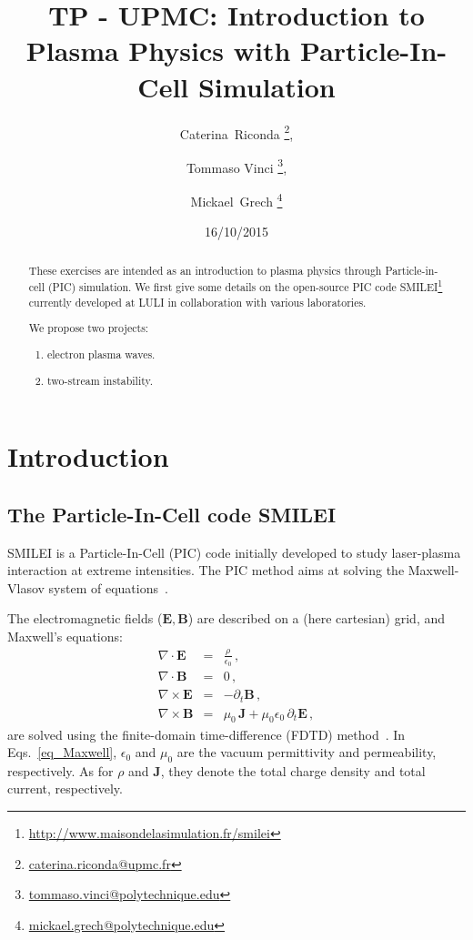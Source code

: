 \documentclass[11pt,a4paper]{article}
\newcommand{\vE}{\mathbf{E}}
\newcommand{\vB}{\mathbf{B}}
\newcommand{\vJ}{\mathbf{J}}
\begin{document}
\title{TP - UPMC: Introduction to Plasma Physics with Particle-In-Cell Simulation}


\author{Caterina~Riconda \footnote{\url{caterina.riconda@upmc.fr}}, \and Tommaso Vinci \footnote{\url{tommaso.vinci@polytechnique.edu}}, \and Mickael~Grech \footnote{\url{mickael.grech@polytechnique.edu}}}

\date{16/10/2015}

\maketitle              


\begin{abstract}
These exercises are intended as an introduction to plasma physics through Particle-in-cell (PIC) simulation.
We first give some details on the open-source PIC code SMILEI\footnote{\url{http://www.maisondelasimulation.fr/smilei}} currently developed at LULI in collaboration with various laboratories.

We propose two projects: 
\begin{enumerate}
\item electron plasma waves.
\item two-stream instability.
\end{enumerate}
\end{abstract}




\section*{Introduction}\label{intro}

\subsection*{The Particle-In-Cell code SMILEI}

SMILEI is a Particle-In-Cell (PIC) code initially developed to study laser-plasma interaction at extreme intensities. 
The PIC method aims at solving the Maxwell-Vlasov system of  equations~\cite{birdsall_langdon}.

The electromagnetic fields ($\vE,\vB$) are described on a (here cartesian) grid, and Maxwell's equations:
\begin{subequations}\label{eq_Maxwell}
\begin{eqnarray}
\nabla \cdot \vE &=& \frac{\rho}{\epsilon_0} \,,\\
\nabla \cdot \vB &=& 0 \,,\\
\nabla \times \vE &=& -\partial_t \vB \,,\\
\nabla \times \vB &=& \mu_0\, \vJ + \mu_0 \epsilon_0\,\partial_t \vE \,,
\end{eqnarray}
\end{subequations}
are solved using the finite-domain time-difference (FDTD) method~\cite{taflove_2005}.
In Eqs.~\eqref{eq_Maxwell}, $\epsilon_0$ and $\mu_0$ are the vacuum permittivity and permeability, respectively. 
As for $\rho$ and $\vJ$, they denote the total charge density and total current, respectively.
\end{document}
